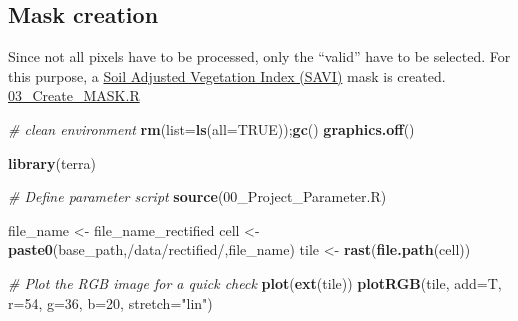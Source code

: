 \documentclass[
]{article}
\newenvironment{Shaded}{\begin{snugshade}}{\end{snugshade}}
\newcommand{\AttributeTok}[1]{\textcolor[rgb]{0.13,0.29,0.53}{#1}}
\newcommand{\CommentTok}[1]{\textcolor[rgb]{0.56,0.35,0.01}{\textit{#1}}}
\newcommand{\ConstantTok}[1]{\textcolor[rgb]{0.56,0.35,0.01}{#1}}
\newcommand{\DecValTok}[1]{\textcolor[rgb]{0.00,0.00,0.81}{#1}}
\newcommand{\FunctionTok}[1]{\textcolor[rgb]{0.13,0.29,0.53}{\textbf{#1}}}
\newcommand{\NormalTok}[1]{#1}
\newcommand{\OtherTok}[1]{\textcolor[rgb]{0.56,0.35,0.01}{#1}}
\newcommand{\StringTok}[1]{\textcolor[rgb]{0.31,0.60,0.02}{#1}}
\begin{document}
\subsection{Mask creation}\label{mask-creation}

Since not all pixels have to be processed, only the ``valid'' have to be
selected. For this purpose, a
\href{https://www.usgs.gov/landsat-missions/landsat-soil-adjusted-vegetation-index}{Soil
Adjusted Vegetation Index (SAVI)} mask is created.
\href{https://github.com/patrickangst/UWW200_Master_Thesis_public/blob/main/MasterThesisRCode/03_Create_MASK.R}{03\_Create\_MASK.R}

\begin{Shaded}
\begin{Highlighting}[]
\CommentTok{\# clean environment}
\FunctionTok{rm}\NormalTok{(}\AttributeTok{list=}\FunctionTok{ls}\NormalTok{(}\AttributeTok{all=}\ConstantTok{TRUE}\NormalTok{));}\FunctionTok{gc}\NormalTok{()}
\FunctionTok{graphics.off}\NormalTok{()}

\FunctionTok{library}\NormalTok{(terra)}

\CommentTok{\# Define parameter script}
\FunctionTok{source}\NormalTok{(}\StringTok{\textquotesingle{}00\_Project\_Parameter.R\textquotesingle{}}\NormalTok{)}

\NormalTok{file\_name }\OtherTok{\textless{}{-}}\NormalTok{ file\_name\_rectified}
\NormalTok{cell }\OtherTok{\textless{}{-}} \FunctionTok{paste0}\NormalTok{(base\_path,}\StringTok{\textquotesingle{}/data/rectified/\textquotesingle{}}\NormalTok{,file\_name)}
\NormalTok{tile }\OtherTok{\textless{}{-}} \FunctionTok{rast}\NormalTok{(}\FunctionTok{file.path}\NormalTok{(cell))}

\CommentTok{\# Plot the RGB image for a quick check}
\FunctionTok{plot}\NormalTok{(}\FunctionTok{ext}\NormalTok{(tile))}
\FunctionTok{plotRGB}\NormalTok{(tile, }\AttributeTok{add=}\NormalTok{T, }\AttributeTok{r=}\DecValTok{54}\NormalTok{, }\AttributeTok{g=}\DecValTok{36}\NormalTok{, }\AttributeTok{b=}\DecValTok{20}\NormalTok{, }\AttributeTok{stretch=}\StringTok{"lin"}\NormalTok{)}



\end{Highlighting}
\end{Shaded}
\end{document}

